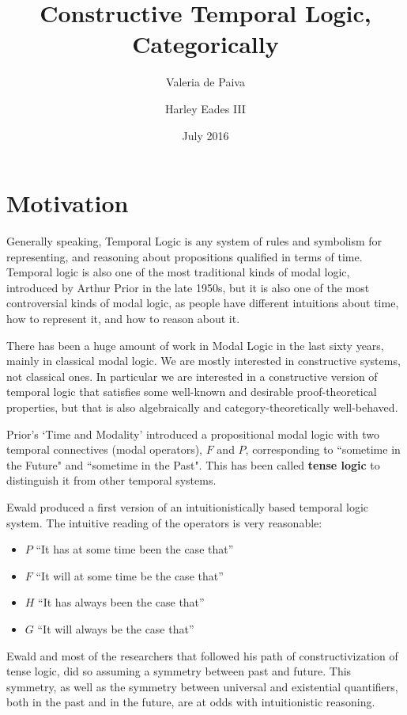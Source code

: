 \documentclass{article}
\title{Constructive Temporal Logic, Categorically}
\author{Valeria de Paiva \and Harley Eades III}
\date{July 2016}
\begin{document}
\maketitle

\section{Motivation}
Generally speaking, Temporal Logic is any system of rules and
symbolism for representing, and reasoning about propositions qualified
in terms of time.  Temporal logic is also one of the most traditional
kinds of modal logic, introduced by Arthur Prior in the late 1950s,
but it is also one of the most controversial kinds of modal logic, as
people have different intuitions about time, how to represent it, and
how to reason about it.

There has been a huge amount of work in Modal Logic in the last sixty
years, mainly in classical modal logic. We are mostly interested
in constructive systems, not classical ones. In particular we are interested in a
constructive version of temporal logic that satisfies some well-known
and desirable proof-theoretical properties, but that is also
algebraically and category-theoretically {well-behaved}.

Prior's `Time and Modality' \cite{prior} introduced a propositional modal logic
with two temporal connectives (modal operators), $F$ and $P$,
corresponding to ``sometime in the {F}uture" and ``sometime in the {P}ast". This has been called \textbf{tense logic} to distinguish it from other temporal systems.

Ewald \cite{ewald1986}  produced a first version of an
intuitionistically based temporal logic system. 
The intuitive reading of the operators is very reasonable:
\begin{itemize}
\item $P$ “It has at some time been the case that” 
\item $F$ “It will at some time be the case that” 
\item $H$ “It has always been the case that” 
\item $G$  “It will always be the case that” 
\end{itemize}
Ewald and most of the researchers that followed his path of
constructivization of tense logic, did so assuming a symmetry between
past and future. This symmetry, as well as the symmetry between
universal and existential quantifiers, both in the past and in the
future, are at odds with
intuitionistic reasoning.
\end{document}
